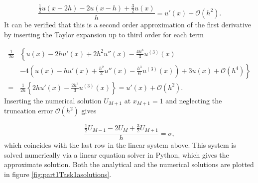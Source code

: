 \begin{equation}
\label{Second-order-first-der-B.C}
    \frac{\frac{1}{2}u(x-2h)-2u(x-h)+\frac{3}{2}u(x)}{h} = u'(x) + \mathcal{O}(h^2). 
\end{equation}
It can be verified that this is a second order approximation of the first derivative by inserting the Taylor expansion up to third order for each term 

\begin{equation*}
    \begin{split}
        \frac{1}{2h}& \left\{u(x)-2hu'(x)+2h^2u''(x)-\frac{4h^3}{3}u^{(3)}(x) \right.\\
        &\left.-4\left(u(x) -hu'(x)+\frac{h^2}{2}u''(x)-\frac{h^3}{6}u^{(3)}(x)\right) + 3u(x) + \mathcal{O}(h^4)\right\} \\
        = &\frac{1}{2h}\left\{2h u'(x) - \frac{2h^3}{3}u^{(3)}(x)\right\} = u'(x) + \mathcal{O}(h^2).
    \end{split}
\end{equation*}
Inserting the numerical solution $U_{M+1}$ at $x_{M+1} = 1$ and neglecting the truncation error $\mathcal{O}(h^2)$ gives 

\begin{equation*}
    \frac{\frac{1}{2}U_{M-1}-2U_{M}+\frac{3}{2}U_{M+1}}{h} = \sigma, 
\end{equation*}
which coincides with the last row in the linear system above. This system is solved numerically via a linear equation solver in Python, which gives the approximate solution. Both the analytical and the numerical solutions are plotted in figure \ref{fig:part1Task1asolutions}. 

